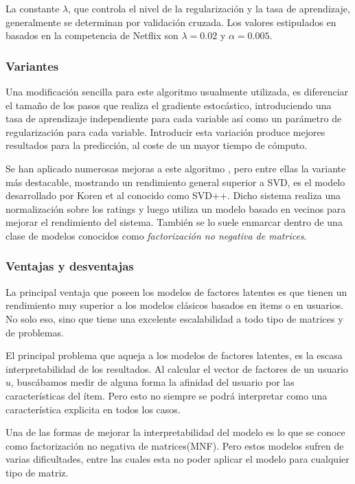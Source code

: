 \documentclass[hidelinks,12pt,a4paper]{book}
\theoremstyle{plain}
\theoremstyle{definition}
\begin{document}
La constante $\lambda$, que controla el nivel de la regularización y la tasa de aprendizaje, generalmente se determinan por validación cruzada. Los valores estipulados en \cite{korenadv} basados en la competencia de Netflix son $\lambda=0.02$ y $\alpha=0.005$.

\subsubsection{Variantes}
Una modificación sencilla para este algoritmo usualmente utilizada, es diferenciar el tamaño de los pasos que realiza el gradiente estocástico, introduciendo una tasa de aprendizaje independiente para cada variable así como un parámetro de regularización para cada variable. Introducir esta variación produce mejores resultados para la predicción\cite{takacs2007major}, al coste de un mayor tiempo de cómputo.

Se han aplicado numerosas mejoras a este algoritmo \cite{paterek2007improving}, pero entre ellas la variante más destacable, mostrando un rendimiento general superior a SVD, es el modelo desarrollado por Koren et al\cite{koren2008factorization} conocido como SVD++. Dicho sistema realiza una normalización sobre los ratings y luego utiliza un modelo basado en vecinos para mejorar el rendimiento del sistema. También se lo suele enmarcar dentro de una clase de modelos conocidos como \textit{factorización no negativa de matrices}\cite{agg}.

\subsubsection{Ventajas y desventajas}

La principal ventaja que poseen los modelos de factores latentes es que tienen un rendimiento muy superior a los modelos clásicos basados en items o en usuarios\cite{agg}. No solo eso, sino que tiene una excelente escalabilidad a todo tipo de matrices y de problemas.

El principal problema que aqueja a los modelos de factores latentes, es la escasa interpretabilidad de los resultados. Al calcular el vector de factores de un usuario $u$, buscábamos medir de alguna forma la afinidad del usuario por las características del ítem. Pero esto no siempre se podrá interpretar como una característica explicita en todos los casos. 

Una de las formas de mejorar la interpretabilidad del modelo es lo que se conoce como factorización no negativa de matrices(MNF)\cite{agg}. Pero estos modelos sufren de varias dificultades, entre las cuales esta no poder aplicar el modelo para cualquier tipo de matriz.
\end{document}
